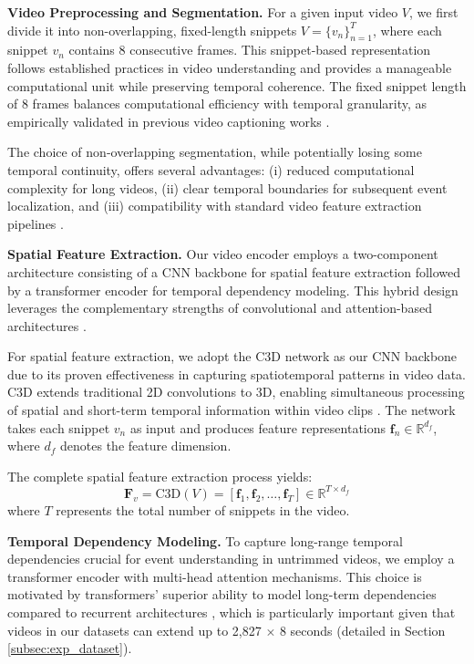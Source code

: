 \textbf{Video Preprocessing and Segmentation.}
For a given input video $V$, we first divide it into non-overlapping, fixed-length snippets $V=\{v_n\}_{n=1}^{T}$, where each snippet $v_n$ contains 8 consecutive frames. This snippet-based representation follows established practices in video understanding \cite{Wang2019-xv,Feichtenhofer2019-mh} and provides a manageable computational unit while preserving temporal coherence. The fixed snippet length of 8 frames balances computational efficiency with temporal granularity, as empirically validated in previous video captioning works \cite{Krishna2017-pw,Zhou2018-zu}.

The choice of non-overlapping segmentation, while potentially losing some temporal continuity, offers several advantages: (i) reduced computational complexity for long videos, (ii) clear temporal boundaries for subsequent event localization, and (iii) compatibility with standard video feature extraction pipelines \cite{Carreira2017-fg,Tran2015-uq}.

\textbf{Spatial Feature Extraction.}
Our video encoder employs a two-component architecture consisting of a CNN backbone for spatial feature extraction followed by a transformer encoder for temporal dependency modeling. This hybrid design leverages the complementary strengths of convolutional and attention-based architectures \cite{Dosovitskiy2021-vn,Arnab2021-gv}.

For spatial feature extraction, we adopt the C3D network \cite{Tran2015-uq} as our CNN backbone due to its proven effectiveness in capturing spatiotemporal patterns in video data. C3D extends traditional 2D convolutions to 3D, enabling simultaneous processing of spatial and short-term temporal information within video clips \cite{Karpathy2014-xm}. The network takes each snippet $v_n$ as input and produces feature representations $\mathbf{f}_n \in \mathbb{R}^{d_f}$, where $d_f$ denotes the feature dimension.

The complete spatial feature extraction process yields:
\begin{equation}
  \mathbf{F}_v = \text{C3D}(V) = [\mathbf{f}_1, \mathbf{f}_2, \ldots, \mathbf{f}_T] \in \mathbb{R}^{T \times d_f}
  \label{eq:spatial_features}
\end{equation}
where $T$ represents the total number of snippets in the video.

\textbf{Temporal Dependency Modeling.}
To capture long-range temporal dependencies crucial for event understanding in untrimmed videos, we employ a transformer encoder \cite{Vaswani2017-sc} with multi-head attention mechanisms. This choice is motivated by transformers' superior ability to model long-term dependencies compared to recurrent architectures \cite{Vaswani2017-sc}, which is particularly important given that videos in our datasets can extend up to 2,827 $\times$ 8 seconds (detailed in Section \ref{subsec:exp_dataset}).

